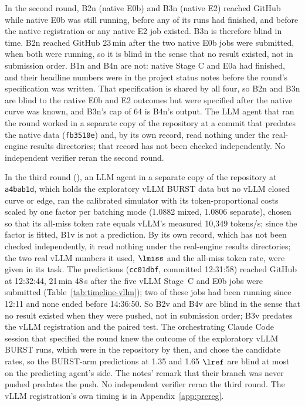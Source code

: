In the second round, B2n (native E0b) and B3n (native E2) reached GitHub while native E0b was still running, before any of its runs had finished, and before the native registration or any native E2 job existed. B3n is therefore blind in time. B2n reached GitHub 23\,min after the two native E0b jobs were submitted, when both were running, so it is blind in the sense that no result existed, not in submission order. B1n and B4n are not: native Stage C and E0a had finished, and their headline numbers were in the project status notes before the round's specification was written. That specification is shared by all four, so B2n and B3n are blind to the native E0b and E2 outcomes but were specified after the native curve was known, and B3n's cap of 64 is B4n's output. The LLM agent that ran the round worked in a separate copy of the repository at a commit that predates the native data (\texttt{fb3510e}) and, by its own record, read nothing under the real-engine results directories; that record has not been checked independently. No independent verifier reran the second round.

In the third round (), an LLM agent in a separate copy of the repository at \texttt{a4bab1d}, which holds the exploratory vLLM BURST data but no vLLM closed curve or edge, ran the calibrated simulator with its token-proportional costs scaled by one factor per batching mode (1.0882 mixed, 1.0806 separate), chosen so that its all-miss token rate equals vLLM's measured 10,349 tokens/s; since the factor is fitted, B1v is not a prediction. By its own record, which has not been checked independently, it read nothing under the real-engine results directories; the two real vLLM numbers it used, $\lmiss$ and the all-miss token rate, were given in its task. The predictions (\texttt{cc01dbf}, committed 12:31:58) reached GitHub at 12:32:44, 21\,min 48\,s after the five vLLM Stage~C and E0b jobs were submitted (Table~\ref{tab:timeline-vllm}); two of these jobs had been running since 12:11 and none ended before 14:36:50. So B2v and B4v are blind in the sense that no result existed when they were pushed, not in submission order; B3v predates the vLLM registration and the paired test. The orchestrating Claude Code session that specified the round knew the outcome of the exploratory vLLM BURST runs, which were in the repository by then, and chose the candidate rates, so the BURST-arm predictions at 1.35 and 1.65 $\lref$ are blind at most on the predicting agent's side. The notes' remark that their branch was never pushed predates the push. No independent verifier reran the third round. The vLLM registration's own timing is in Appendix~\ref{app:prereg}.

